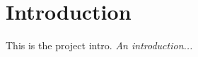 \chapter{Introduction}
\label{chapter:introduction}
This is the project intro.
\emph{An introduction... \cite{example-article}}
